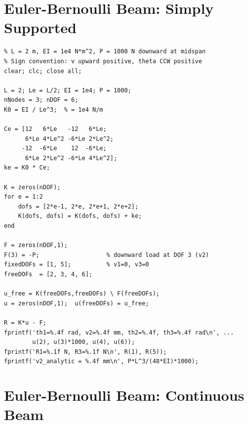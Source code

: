 \section{Euler-Bernoulli Beam: Simply Supported}
\label{lst:beam_simple}

\begin{lstlisting}[caption={Two-element simply supported beam (Chapter~\ref{ch:beam})},
                   label={code:beam_simple}]
% fem_beam_simple.m -- Chapter 5: 2-element simply supported beam
% L = 2 m, EI = 1e4 N*m^2, P = 1000 N downward at midspan
% Sign convention: v upward positive, theta CCW positive
clear; clc; close all;

L = 2; Le = L/2; EI = 1e4; P = 1000;
nNodes = 3; nDOF = 6;
K0 = EI / Le^3;  % = 1e4 N/m

Ce = [12   6*Le   -12   6*Le;
      6*Le 4*Le^2 -6*Le 2*Le^2;
     -12  -6*Le    12  -6*Le;
      6*Le 2*Le^2 -6*Le 4*Le^2];
ke = K0 * Ce;

K = zeros(nDOF);
for e = 1:2
    dofs = [2*e-1, 2*e, 2*e+1, 2*e+2];
    K(dofs, dofs) = K(dofs, dofs) + ke;
end

F = zeros(nDOF,1);
F(3) = -P;                   % downward load at DOF 3 (v2)
fixedDOFs = [1, 5];          % v1=0, v3=0
freeDOFs  = [2, 3, 4, 6];

u_free = K(freeDOFs,freeDOFs) \ F(freeDOFs);
u = zeros(nDOF,1);  u(freeDOFs) = u_free;

R = K*u - F;
fprintf('th1=%.4f rad, v2=%.4f mm, th2=%.4f, th3=%.4f rad\n', ...
        u(2), u(3)*1000, u(4), u(6));
fprintf('R1=%.1f N, R3=%.1f N\n', R(1), R(5));
fprintf('v2_analytic = %.4f mm\n', P*L^3/(48*EI)*1000);
\end{lstlisting}

\section{Euler-Bernoulli Beam: Continuous Beam}
\label{lst:beam_3elem}

